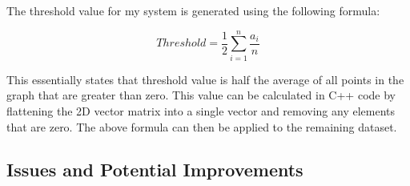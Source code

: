 \documentclass{article}
\begin{document}
The threshold value for my system is generated using the following formula:

\[Threshold = \frac{1}{2}\sum_{i=1}^{n} \frac{a_i}{n}\]

This essentially states that threshold value is half the average of all points in the graph that are greater than zero. This value can be calculated in C++ code by flattening the 2D vector matrix into a single vector and removing any elements that are zero. The above formula can then be applied to the remaining dataset.

\subsection{Issues and Potential Improvements}
\label{sec:issues}
\end{document}
